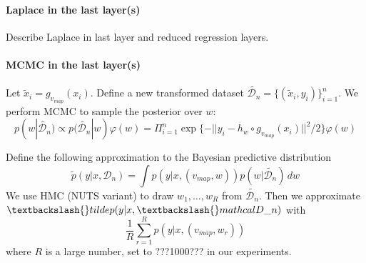 \documentclass{article} %
\begin{document}
\paragraph{Laplace in the last layer(s)}
Describe Laplace in last layer and reduced regression layers.


\paragraph{MCMC in the last layer(s)}
 Let $\tilde x_i = g_{v_{map}}(x_i)$. Define a new transformed dataset $\tilde{\mathcal D_n} = \{(\tilde x_i, y_i) \}_{i=1}^n$. We perform MCMC to sample the posterior over $w$:
$$
p(w | \tilde{\mathcal D_n}) \propto p(\tilde{\mathcal D_n} | w) \varphi(w) = \Pi_{i=1}^n \exp\{-|| y_i - h_w \circ g_{v_{map}}(x_i) ||^2/2\} \varphi(w)
$$

Define the following approximation to the Bayesian predictive distribution
$$
\tilde p(y|x, \mathcal D_n) = \int p(y|x,(v_{map},w)) p(w|\tilde{\mathcal D_n}) \,dw
$$
We use HMC (NUTS variant) \citep{hoffman2014no} to draw $w_1,\ldots,w_R$ from $\tilde{\mathcal D_n}$. Then we approximate $\textbackslash\{\}tilde p(y|x, \textbackslash\{\}mathcal D\_n)$ with
\[
\frac{1}{R} \sum_{r=1}^R p(y|x,(v_{map},w_r))
\]
where $R$ is a large number, set to ???1000??? in our experiments.

%
\end{document}
